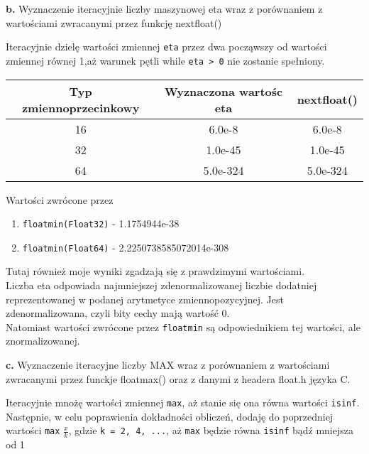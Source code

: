 \documentclass[15pt, a4paper]{article}
\begin{document}
\vspace{0.5cm}

\textbf{b. } Wyznaczenie iteracyjnie liczby maszynowej eta wraz z porównaniem z wartościami zwracanymi przez funkcję nextfloat()

\vspace{0.5cm}

Iteracyjnie dzielę wartości zmiennej \verb|eta| przez dwa począwszy od wartości zmiennej równej 1,aż warunek pętli while \verb|eta > 0| nie zostanie spełniony. 

\begin{table}[ht]
    \begin{tabular}{|c|c|c|}
        \hline 
        Typ zmiennoprzecinkowy & Wyznaczona wartośc eta & nextfloat() \\ \hline
        16 & 6.0e-8 & 6.0e-8 \\ \hline
        32 & 1.0e-45 & 1.0e-45 \\ \hline
        64 & 5.0e-324 & 5.0e-324 \\ \hline
    \end{tabular}
    \label{tab:eta}
\end{table}

Wartości zwrócone przez
\begin{enumerate}
    \item \verb|floatmin(Float32)| - 1.1754944e-38
    \item \verb|floatmin(Float64)| - 2.2250738585072014e-308
\end{enumerate}

Tutaj również moje wyniki zgadzają się z prawdzimymi wartościami. \\
Liczba eta odpowiada najmniejszej zdenormalizowanej liczbie dodatniej reprezentowanej w podanej arytmetyce zmiennopozycyjnej. Jest zdenormalizowana, czyli bity cechy mają wartość 0. \\
Natomiast wartości zwrócone przez \verb|floatmin| są odpowiednikiem tej wartości, ale znormalizowanej.

\vspace{0.5cm}

\textbf{c. } Wyznaczenie iteracyjne liczby MAX wraz z porównaniem z wartościami zwracanymi przez funckje floatmax() oraz z danymi z headera float.h języka C.

\vspace{0.5cm}

Iteracyjnie mnożę wartości zmiennej \verb|max|, aż stanie się ona równa wartości \verb|isinf|. Następnie, w celu poprawienia dokładności obliczeń, dodaję do poprzedniej wartości \verb|max| $\frac{x}{k}$, gdzie \verb|k = 2, 4, ...|, aż \verb|max| będzie równa \verb|isinf| bądź mniejsza od 1
\end{document}
